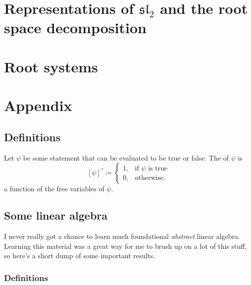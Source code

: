 \documentclass{article}
\newcommand{\slalg}{\ensuremath{\mathfrak{sl}}}
\begin{document}
\section{Representations of \texorpdfstring{$\slalg_2$}{sl2} and the root space decomposition}

\begin{theorem}
\end{theorem}

\section{Root systems}

\begin{definition}
\end{definition}

\section{Appendix}

\subsection{Definitions}

\begin{definition}
    \label{def:Iverson}
    Let $\psi$ be some statement that can be evaluated to be true or false.
    The  of $\psi$ is
    \[
        [\psi]^? \coloneq \begin{cases}
            1, & \text{if }\psi\text{ is true} \\
            0, & \text{otherwise}.
        \end{cases}
    \]
    a function of the free variables of $\psi$.
\end{definition}

\subsection{Some linear algebra}

I never really got a chance to learn much foundational \textit{abstract} linear algebra.
Learning this material was a great way for me to brush up on a lot of this stuff, so here's a short dump of some important results.

\subsubsection{Definitions}
\end{document}
